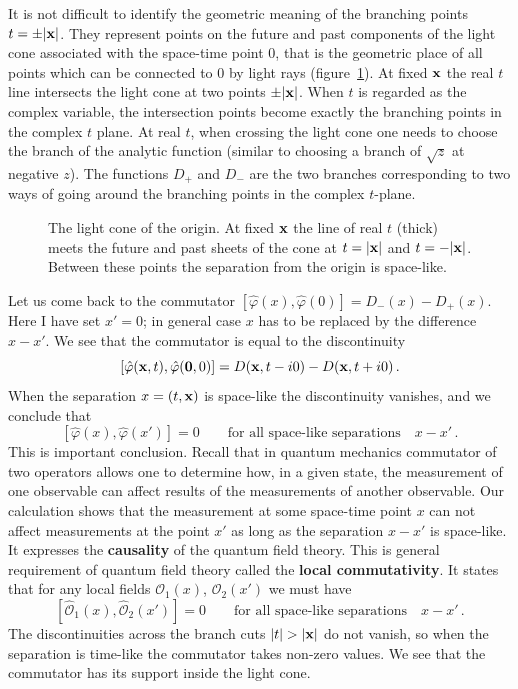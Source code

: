 It is not difficult to identify the geometric meaning of the branching points
$t=\pm|\mathbf{x}|$. They represent points on the future and past components of the
light cone associated with the space-time point $0$, that is the geometric
place of all points which can be connected to $0$ by light rays
(figure~\ref{fig:lightcone}). At fixed $\mathbf{x}$ the real $t$ line intersects the
light cone at two points $\pm|\mathbf{x}|$. When $t$ is regarded as the complex
variable, the intersection points become exactly the branching points in the
complex $t$ plane. At real $t$, when crossing the light cone one needs to
choose the branch of the analytic function (similar to choosing a branch of
$\sqrt z$ at negative $z$). The functions $D_+$ and $D_-$ are the two branches
corresponding to two ways of going around the branching points in the complex
$t$-plane.
\begin{figure}[ht]
\centering{}
\caption{The light cone of the origin. At fixed $\mathbf{x}$ the line of real $t$
(thick) meets the future and past sheets of the cone at $t=|\mathbf{x}|$ and
$t=-|\mathbf{x}|$. Between these points the separation from the origin is
space-like.}
\label{fig:lightcone}
\end{figure}

Let us come back to the commutator
$[\hat\varphi(x),\hat\varphi(0)]=D_-(x)-D_+(x)$. Here I have set $x'=0$; in
general case $x$ has to be replaced by the difference $x-x'$. We see that the
commutator is equal to the discontinuity
\[
[\hat\varphi(\mathbf{x},t),\hat\varphi(\mathbf0,0)]=D(\mathbf{x},t-i0)-D(\mathbf{x},t+i0)\,.
\]
When the separation $x=(t,\mathbf{x})$ is space-like the discontinuity vanishes, and
we conclude that
\[
[\hat\varphi(x),\hat\varphi(x')]=0\qquad\text{for all space-like separations}\quad x-x'\,.
\]
This is important conclusion. Recall that in quantum mechanics commutator of
two operators allows one to determine how, in a given state, the measurement
of one observable can affect results of the measurements of another
observable. Our calculation shows that the measurement at some space-time
point $x$ can not affect measurements at the point $x'$ as long as the
separation $x-x'$ is space-like. It expresses the \textbf{causality} of the
quantum field theory. This is general requirement of quantum field theory
called the \textbf{local commutativity}. It states that for any local fields
$\mathcal O_1(x)$, $\mathcal O_2(x')$ we must have
\[
[\hat{\mathcal O}_1(x),\hat{\mathcal O}_2(x')]=0\qquad\text{for all space-like separations}\quad x-x'\,.
\]
The discontinuities across the branch cuts $|t|>|\xx|$ do not vanish, so when
the separation is time-like the commutator takes non-zero values. We see that
the commutator has its support inside the light cone.

